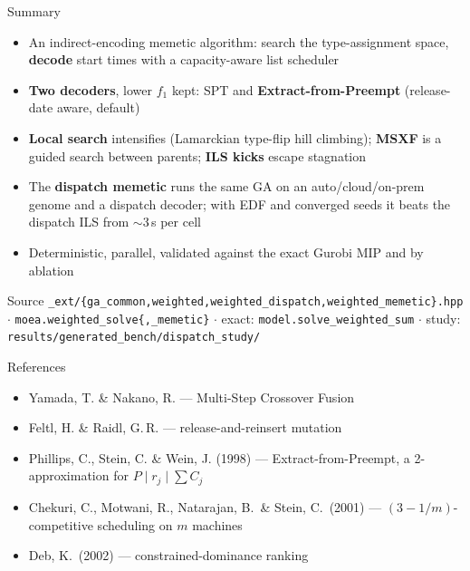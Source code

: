 \documentclass[aspectratio=169,t]{beamer}
\newcommand{\code}[1]{\texttt{#1}}
\begin{document}
\begin{frame}{Summary}
  \begin{itemize}
    \item An \alert{indirect-encoding memetic algorithm}: search the
      type-assignment space, \textbf{decode} start times with a
      capacity-aware list scheduler
    \item \textbf{Two decoders}, lower $f_1$ kept: SPT and
      \textbf{Extract-from-Preempt} (release-date aware, default)
    \item \textbf{Local search} intensifies (Lamarckian type-flip hill
      climbing); \textbf{MSXF} is a guided search between parents;
      \textbf{ILS kicks} escape stagnation
    \item The \textbf{dispatch memetic} runs the same GA on an
      auto/cloud/on-prem genome and a dispatch decoder; with EDF and
      converged seeds it beats the dispatch ILS from $\sim$3\,s per cell
    \item Deterministic, parallel, validated against the exact Gurobi MIP
      and by ablation
  \end{itemize}
  \begin{block}{Source}
    \scriptsize
    \code{\_ext/\{ga\_common,weighted,weighted\_dispatch,weighted\_memetic\}.hpp}
    $\cdot$ \code{moea.weighted\_solve\{,\_memetic\}} $\cdot$ exact:
    \code{model.solve\_weighted\_sum} $\cdot$ study:
    \code{results/generated\_bench/dispatch\_study/}
  \end{block}
\end{frame}

\begin{frame}{References}
  \small
  \begin{itemize}
    \item Yamada, T. \& Nakano, R. --- Multi-Step Crossover Fusion
    \item Feltl, H. \& Raidl, G.\,R. --- release-and-reinsert mutation
    \item Phillips, C., Stein, C. \& Wein, J. (1998) --- Extract-from-Preempt,
      a 2-approximation for $P \mid r_j \mid \sum C_j$
    \item Chekuri, C., Motwani, R., Natarajan, B.\ \& Stein, C.\ (2001) ---
      $(3{-}1/m)$-competitive scheduling on $m$ machines
    \item Deb, K.\ (2002) --- constrained-dominance ranking
  \end{itemize}
\end{frame}
\end{document}
